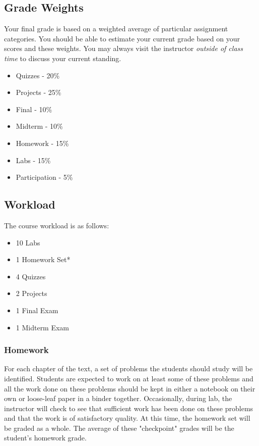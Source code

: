 \documentclass[10pt]{article}
\begin{document}
\subsection{Grade Weights}
Your final grade is based on a weighted average of particular assignment categories.  You should be able to estimate your current grade based on your scores and these weights.  You may always visit the instructor \textit{outside of class time} to discuss your current standing.  
\begin{itemize}
\item Quizzes - 20\%
\item Projects - 25\%
\item Final - 10\%
\item Midterm - 10\%
\item Homework - 15\%
\item Labs - 15\%
\item Participation - 5\%
\end{itemize}

\subsection{Workload}
The course workload is as follows:
\begin{itemize}
\item 10 Labs
\item 1 Homework Set*
\item 4 Quizzes
\item 2 Projects
\item 1 Final Exam
\item 1 Midterm Exam
\end{itemize}

\subsubsection{Homework}

For each chapter of the text, a set of problems the students should study will be identified.  Students are expected to work on at least some of these problems and all the work done on these problems should be kept in either a notebook on their own or loose-leaf paper in a binder together.  Occasionally, during lab, the instructor will check to see that sufficient work has been done on these problems and that the work is of satisfactory quality. At this time, the homework set will be graded as a whole.  The average of these "checkpoint" grades will be the student's homework grade.  
\end{document}

